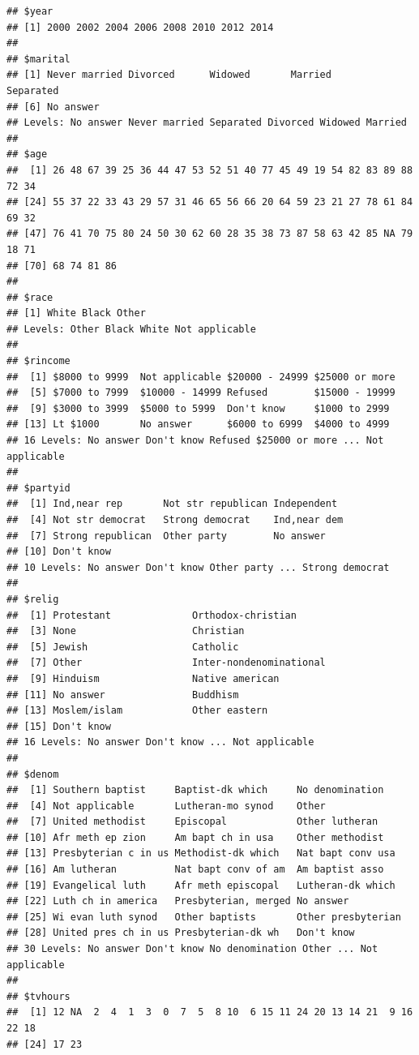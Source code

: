 \documentclass[]{book}
\newenvironment{Shaded}{\begin{snugshade}}{\end{snugshade}}
\newcommand{\KeywordTok}[1]{\textcolor[rgb]{0.13,0.29,0.53}{\textbf{#1}}}
\newcommand{\NormalTok}[1]{#1}
\newcommand{\OperatorTok}[1]{\textcolor[rgb]{0.81,0.36,0.00}{\textbf{#1}}}
\newcommand{\StringTok}[1]{\textcolor[rgb]{0.31,0.60,0.02}{#1}}
\theoremstyle{definition}
\theoremstyle{definition}
\theoremstyle{definition}
\theoremstyle{remark}
\begin{document}
\begin{Shaded}
\end{Shaded}

\begin{verbatim}
## $year
## [1] 2000 2002 2004 2006 2008 2010 2012 2014
## 
## $marital
## [1] Never married Divorced      Widowed       Married       Separated    
## [6] No answer    
## Levels: No answer Never married Separated Divorced Widowed Married
## 
## $age
##  [1] 26 48 67 39 25 36 44 47 53 52 51 40 77 45 49 19 54 82 83 89 88 72 34
## [24] 55 37 22 33 43 29 57 31 46 65 56 66 20 64 59 23 21 27 78 61 84 69 32
## [47] 76 41 70 75 80 24 50 30 62 60 28 35 38 73 87 58 63 42 85 NA 79 18 71
## [70] 68 74 81 86
## 
## $race
## [1] White Black Other
## Levels: Other Black White Not applicable
## 
## $rincome
##  [1] $8000 to 9999  Not applicable $20000 - 24999 $25000 or more
##  [5] $7000 to 7999  $10000 - 14999 Refused        $15000 - 19999
##  [9] $3000 to 3999  $5000 to 5999  Don't know     $1000 to 2999 
## [13] Lt $1000       No answer      $6000 to 6999  $4000 to 4999 
## 16 Levels: No answer Don't know Refused $25000 or more ... Not applicable
## 
## $partyid
##  [1] Ind,near rep       Not str republican Independent       
##  [4] Not str democrat   Strong democrat    Ind,near dem      
##  [7] Strong republican  Other party        No answer         
## [10] Don't know        
## 10 Levels: No answer Don't know Other party ... Strong democrat
## 
## $relig
##  [1] Protestant              Orthodox-christian     
##  [3] None                    Christian              
##  [5] Jewish                  Catholic               
##  [7] Other                   Inter-nondenominational
##  [9] Hinduism                Native american        
## [11] No answer               Buddhism               
## [13] Moslem/islam            Other eastern          
## [15] Don't know             
## 16 Levels: No answer Don't know ... Not applicable
## 
## $denom
##  [1] Southern baptist     Baptist-dk which     No denomination     
##  [4] Not applicable       Lutheran-mo synod    Other               
##  [7] United methodist     Episcopal            Other lutheran      
## [10] Afr meth ep zion     Am bapt ch in usa    Other methodist     
## [13] Presbyterian c in us Methodist-dk which   Nat bapt conv usa   
## [16] Am lutheran          Nat bapt conv of am  Am baptist asso     
## [19] Evangelical luth     Afr meth episcopal   Lutheran-dk which   
## [22] Luth ch in america   Presbyterian, merged No answer           
## [25] Wi evan luth synod   Other baptists       Other presbyterian  
## [28] United pres ch in us Presbyterian-dk wh   Don't know          
## 30 Levels: No answer Don't know No denomination Other ... Not applicable
## 
## $tvhours
##  [1] 12 NA  2  4  1  3  0  7  5  8 10  6 15 11 24 20 13 14 21  9 16 22 18
## [24] 17 23
\end{verbatim}
\end{document}
